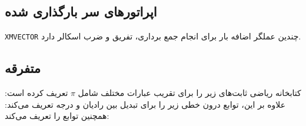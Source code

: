 \textbf{\vspace{-60pt}}

\subsection{\textbf{اپراتورهای سر بارگذاری شده}}
\label{subsec:1.6.5}
{
    \Large
    \begin{spacing}{1.5}
        \texttt{XMVECTOR} چندین عملگر اضافه بار برای انجام جمع برداری، تفریق و ضرب اسکالر دارد.
        \textbf{\vspace{6pt}}
        \lr{}
    \end{spacing}
}

\textbf{\vspace{-65pt}}

\subsection{\textbf{متفرقه}}
\label{subsec:1.6.6}
{
    \Large
    \begin{spacing}{1.5}
        کتابخانه ریاضی  ثابت‌های زیر را برای تقریب عبارات مختلف شامل $\pi$ تعریف کرده است:
        \textbf{\vspace{6pt}}
        \lr{}
        \textbf{\vspace{6pt}}
        علاوه بر این، توابع درون خطی زیر را برای تبدیل بین رادیان و درجه تعریف می‌کند:
        \textbf{\vspace{6pt}}
        \lr{}
        \textbf{\vspace{6pt}}
        همچنین توابع  را تعریف می‌کند:
        \textbf{\vspace{6pt}}
        \lr{}
    \end{spacing}
}

\textbf{\vspace{-60pt}}

